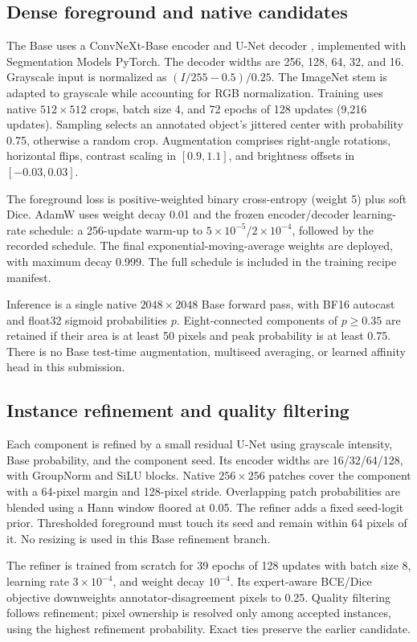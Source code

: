 \documentclass[sigconf]{acmart}
\begin{document}
\subsection{Dense foreground and native candidates}
The Base uses a ConvNeXt-Base encoder \cite{convnext} and U-Net decoder \cite{unet}, implemented with Segmentation Models PyTorch. The decoder widths are 256, 128, 64, 32, and 16. Grayscale input is normalized as $(I/255-0.5)/0.25$. The ImageNet stem is adapted to grayscale while accounting for RGB normalization. Training uses native $512\times512$ crops, batch size 4, and 72 epochs of 128 updates (9,216 updates). Sampling selects an annotated object's jittered center with probability 0.75, otherwise a random crop. Augmentation comprises right-angle rotations, horizontal flips, contrast scaling in $[0.9,1.1]$, and brightness offsets in $[-0.03,0.03]$.

The foreground loss is positive-weighted binary cross-entropy (weight 5) plus soft Dice. AdamW uses weight decay 0.01 and the frozen encoder/decoder learning-rate schedule: a 256-update warm-up to $5\!\times\!10^{-5}$/$2\!\times\!10^{-4}$, followed by the recorded schedule. The final exponential-moving-average weights are deployed, with maximum decay 0.999. The full schedule is included in the training recipe manifest.

Inference is a single native $2048\times2048$ Base forward pass, with BF16 autocast and float32 sigmoid probabilities $p$. Eight-connected components of $p\geq0.35$ are retained if their area is at least 50 pixels and peak probability is at least 0.75. There is no Base test-time augmentation, multiseed averaging, or learned affinity head in this submission.

\subsection{Instance refinement and quality filtering}
Each component is refined by a small residual U-Net using grayscale intensity, Base probability, and the component seed. Its encoder widths are 16/32/64/128, with GroupNorm and SiLU blocks. Native $256\times256$ patches cover the component with a 64-pixel margin and 128-pixel stride. Overlapping patch probabilities are blended using a Hann window floored at 0.05. The refiner adds a fixed seed-logit prior. Thresholded foreground must touch its seed and remain within 64 pixels of it. No resizing is used in this Base refinement branch.

The refiner is trained from scratch for 39 epochs of 128 updates with batch size 8, learning rate $3\!\times\!10^{-4}$, and weight decay $10^{-4}$. Its expert-aware BCE/Dice objective downweights annotator-disagreement pixels to 0.25. Quality filtering follows refinement; pixel ownership is resolved only among accepted instances, using the highest refinement probability. Exact ties preserve the earlier candidate.
\end{document}
